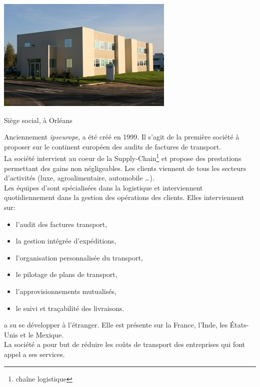 
\mysection{\interlog}

	\begin{photo}[!h]
		\centering
		\includegraphics[scale=0.5]{./images/siege_interlog}
		\caption{Siège social, \interlog à Orléans}
	\end{photo}

		Anciennement \textit{ipseurope}, \interlog a été créé en 1999. Il s'agit de la première société à proposer sur le continent européen des audits de factures de transport.\\

		La société intervient au coeur de la \og Supply-Chain\fg \footnote{chaîne logistique}  et propose des prestations permettant des gains non négligeables. Les clients viennent de tous les secteurs d'activités (luxe, agroalimentaire, automobile \ldots).  \\

		Les équipes d'\interlog sont spécialisées dans la logistique et interviennent quotidiennement dans la gestion des opérations des clients. Elles interviennent sur:
		\begin{itemize}
			\item l'audit des factures transport,
			\item la gestion intégrée d’expéditions,
			\item l'organisation personnalisée du transport,
			\item le pilotage de plans de transport,
			\item l'approvisionnements mutualisés,
			\item le suivi et traçabilité des livraisons.
		\end{itemize}	
		
		\interlog  a su se développer à l'étranger. Elle est présente sur la France, l'Inde, les États-Unis et le Mexique.\\
		
		La société a pour but de réduire les coûts de transport des entreprises qui font appel a ses services.

    

    
    
    
   
